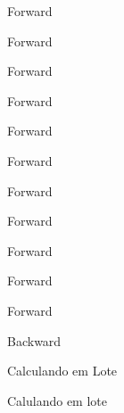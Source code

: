 \documentclass[10pt]{beamer}
\begin{document}
\begin{frame}{Forward}

\end{frame}

\begin{frame}{Forward}

\end{frame}

\begin{frame}{Forward}

\end{frame}

\begin{frame}{Forward}

\end{frame}

\begin{frame}{Forward}

\end{frame}

\begin{frame}{Forward}

\end{frame}

\begin{frame}{Forward}

\end{frame}

\begin{frame}{Forward}

\end{frame}

\begin{frame}{Forward}

\end{frame}

\begin{frame}{Forward}

\end{frame}

\begin{frame}{Forward}

\end{frame}

\begin{frame}{Backward}

\end{frame}

\begin{frame}{Calculando em Lote}

\end{frame}


\begin{frame}{Calulando em lote}

\end{frame}
\end{document}
